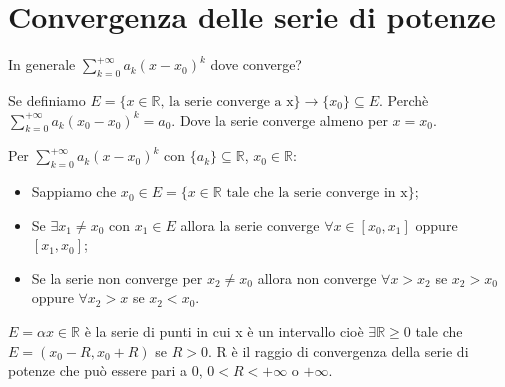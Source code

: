 \section{Convergenza delle serie di potenze}
In generale $\sum^{+\infty}_{k=0}a_k(x-x_0)^k$ dove converge?

Se definiamo $E=\{x\in\mathbb{R}\text{, la serie converge a x}\}\to\{x_0\}\subseteq E$. Perchè $\sum^{+\infty}_{k=0}a_k(x_0-x_0)^k=a_0$. Dove la serie converge almeno per $x=x_0$.

\begin{thm}
    Per $\sum^{+\infty}_{k=0}a_k(x-x_0)^k$ con $\{a_k\}\subseteq\mathbb{R}$, $x_0\in\mathbb{R}$:
    \begin{itemize}
        \item Sappiamo che $x_0\in E=\{x\in\mathbb{R}\text{ tale che la serie converge in x}\}$;
        \item Se $\exists x_1\neq x_0$ con $x_1\in E$ allora la serie converge $\forall x\in[x_0,x_1]$ oppure $[x_1,x_0]$;
        \item Se la serie non converge per $x_2\neq x_0$ allora non converge $\forall x>x_2$ se $x_2>x_0$ oppure $\forall x_2>x$ se $x_2<x_0$.
    \end{itemize}
\end{thm}

\begin{definition*}
    $E=\alpha x\in\mathbb{R}$ è la serie di punti in cui x è un intervallo cioè $\exists\mathbb{R}\geq0$ tale che $E=(x_0-R,x_0+R)$ se $R>0$.
    R è il raggio di convergenza della serie di potenze che può essere pari a $0$, $0<R<+\infty$ o $+\infty$.
\end{definition*}

